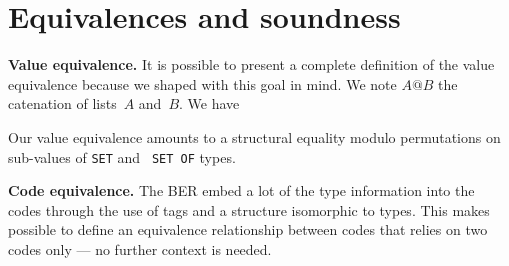 
\section{Equivalences and soundness}

\textbf{Value equivalence.} It is possible to present a complete
definition of the value equivalence because we shaped \core with this
goal in mind. We note $A@B$ the catenation of lists~$A$
and~$B$. We have
Our value equivalence amounts to a structural equality modulo
permutations on sub-values of \texttt{\small SET} and \texttt{\small
SET OF} types.

\medskip

\textbf{Code equivalence.} The BER embed a lot of the type information
into the codes through the use of tags and a structure isomorphic to
types. This makes possible to define an equivalence relationship
between codes that relies on two codes only --- no further context is
needed.


